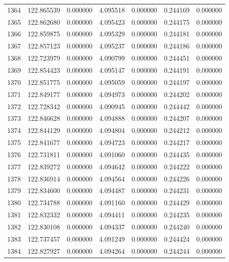 \begin{tabular}{rrrrrrr}
1364 & 122.865539 &    0.000000 &  4.095518 &    0.000000 &    0.244169 &  0.000000 \\
1365 & 122.862680 &    0.000000 &  4.095423 &    0.000000 &    0.244175 &  0.000000 \\
1366 & 122.859875 &    0.000000 &  4.095329 &    0.000000 &    0.244181 &  0.000000 \\
1367 & 122.857123 &    0.000000 &  4.095237 &    0.000000 &    0.244186 &  0.000000 \\
1368 & 122.723979 &    0.000000 &  4.090799 &    0.000000 &    0.244451 &  0.000000 \\
1369 & 122.854423 &    0.000000 &  4.095147 &    0.000000 &    0.244191 &  0.000000 \\
1370 & 122.851775 &    0.000000 &  4.095059 &    0.000000 &    0.244197 &  0.000000 \\
1371 & 122.849177 &    0.000000 &  4.094973 &    0.000000 &    0.244202 &  0.000000 \\
1372 & 122.728342 &    0.000000 &  4.090945 &    0.000000 &    0.244442 &  0.000000 \\
1373 & 122.846628 &    0.000000 &  4.094888 &    0.000000 &    0.244207 &  0.000000 \\
1374 & 122.844129 &    0.000000 &  4.094804 &    0.000000 &    0.244212 &  0.000000 \\
1375 & 122.841677 &    0.000000 &  4.094723 &    0.000000 &    0.244217 &  0.000000 \\
1376 & 122.731811 &    0.000000 &  4.091060 &    0.000000 &    0.244435 &  0.000000 \\
1377 & 122.839272 &    0.000000 &  4.094642 &    0.000000 &    0.244222 &  0.000000 \\
1378 & 122.836914 &    0.000000 &  4.094564 &    0.000000 &    0.244226 &  0.000000 \\
1379 & 122.834600 &    0.000000 &  4.094487 &    0.000000 &    0.244231 &  0.000000 \\
1380 & 122.734788 &    0.000000 &  4.091160 &    0.000000 &    0.244429 &  0.000000 \\
1381 & 122.832332 &    0.000000 &  4.094411 &    0.000000 &    0.244235 &  0.000000 \\
1382 & 122.830108 &    0.000000 &  4.094337 &    0.000000 &    0.244240 &  0.000000 \\
1383 & 122.737457 &    0.000000 &  4.091249 &    0.000000 &    0.244424 &  0.000000 \\
1384 & 122.827927 &    0.000000 &  4.094264 &    0.000000 &    0.244244 &  0.000000 \\

\end{tabular}
